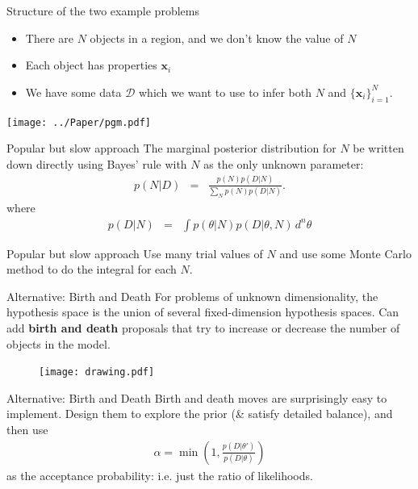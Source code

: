 \begin{frame}[t]{Structure of the two example problems}
  \begin{itemize}
  \setlength{\itemsep}{10pt}
  \item There are $N$ objects in a region, and we don't know the value of $N$
  \item Each object has properties $\mathbf{x}_i$
  \item We have some data $\mathcal{D}$ which we want to use to infer both $N$
        and $\{\mathbf{x}_i\}_{i=1}^N$.
  \end{itemize}
\begin{center}
\texttt{[image: ../Paper/pgm.pdf]}
\end{center}
\end{frame}

\begin{frame}[t]{Popular but slow approach}
The marginal posterior distribution for $N$ be written down directly
using Bayes' rule with $N$ as the only unknown parameter:
\begin{eqnarray}
p(N | D) &=& \frac{p(N)p(D | N)}{\sum_N p(N)p(D | N)}.
\end{eqnarray}
where
\begin{eqnarray}
p(D | N) &=& \int p(\theta | N) p(D | \theta, N) \, d^n \theta
\end{eqnarray}
\end{frame}

\begin{frame}[t]{Popular but slow approach}
Use many trial values of $N$ and use some Monte Carlo method to do the integral
for each $N$.
\end{frame}


\begin{frame}[t]{Alternative: Birth and Death}
For problems of unknown dimensionality, the hypothesis space is the union
of several fixed-dimension hypothesis spaces. Can add {\bf birth and death}
proposals that try to increase or decrease the number of objects in the model.

\begin{figure}
\begin{center}
\texttt{[image: drawing.pdf]}
\end{center}
\end{figure}
\end{frame}


\begin{frame}[t]{Alternative: Birth and Death}
Birth and death moves are surprisingly easy to implement. Design them to
explore the prior (\& satisfy detailed balance), and then use
\begin{eqnarray}
\alpha = \min\left(1, \frac{p(D|\theta')}{p(D|\theta)}\right)
\end{eqnarray}
as the acceptance probability: i.e. just the ratio of likelihoods.
\end{frame}

